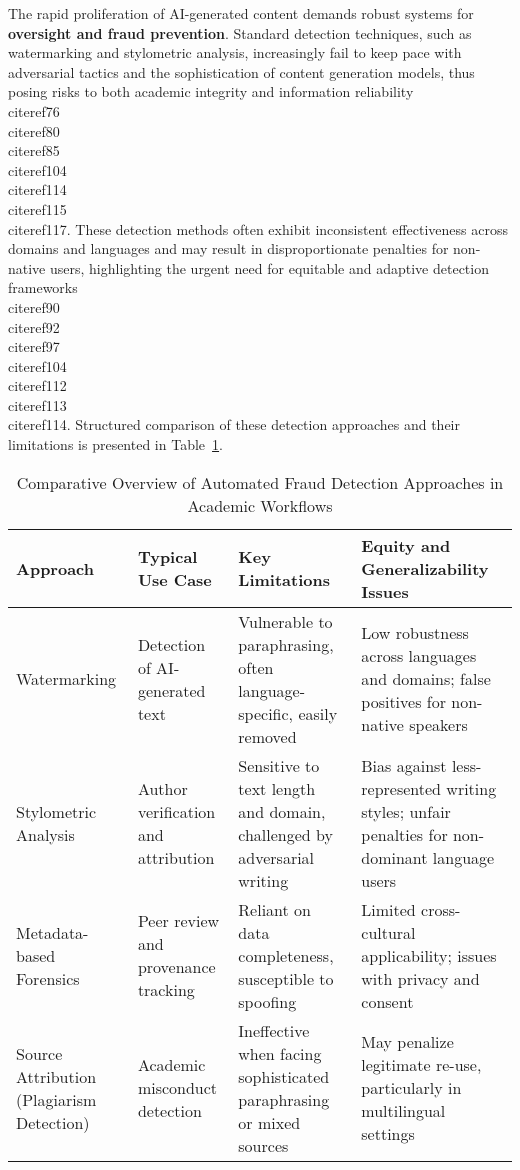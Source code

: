 \documentclass[11pt]{article}
\begin{document}
The rapid proliferation of AI-generated content demands robust systems for \textbf{oversight and fraud prevention}. Standard detection techniques, such as watermarking and stylometric analysis, increasingly fail to keep pace with adversarial tactics and the sophistication of content generation models, thus posing risks to both academic integrity and information reliability \\cite{ref76}\\cite{ref80}\\cite{ref85}\\cite{ref104}\\cite{ref114}\\cite{ref115}\\cite{ref117}. These detection methods often exhibit inconsistent effectiveness across domains and languages and may result in disproportionate penalties for non-native users, highlighting the urgent need for equitable and adaptive detection frameworks \\cite{ref90}\\cite{ref92}\\cite{ref97}\\cite{ref104}\\cite{ref112}\\cite{ref113}\\cite{ref114}. Structured comparison of these detection approaches and their limitations is presented in Table~\ref{tab:fraud_detection_comparison}.

\begin{table}[htbp]
\centering
\caption{Comparative Overview of Automated Fraud Detection Approaches in Academic Workflows}
\label{tab:fraud_detection_comparison}
\begin{tabular}{|l|p{3.5cm}|p{4cm}|p{4cm}|}
\hline
\textbf{Approach}           & \textbf{Typical Use Case}                  & \textbf{Key Limitations}                                         & \textbf{Equity and Generalizability Issues} \\ \hline
Watermarking                & Detection of AI-generated text & Vulnerable to paraphrasing, often language-specific, easily removed & Low robustness across languages and domains; false positives for non-native speakers \\ \hline
Stylometric Analysis        & Author verification and attribution        & Sensitive to text length and domain, challenged by adversarial writing & Bias against less-represented writing styles; unfair penalties for non-dominant language users \\ \hline
Metadata-based Forensics    & Peer review and provenance tracking         & Reliant on data completeness, susceptible to spoofing               & Limited cross-cultural applicability; issues with privacy and consent \\ \hline
Source Attribution (Plagiarism Detection) & Academic misconduct detection                & Ineffective when facing sophisticated paraphrasing or mixed sources & May penalize legitimate re-use, particularly in multilingual settings \\ \hline
\end{tabular}
\end{table}
\end{document}

